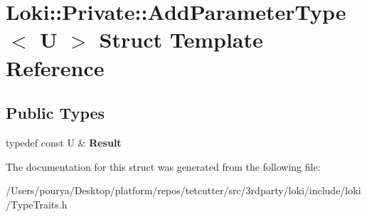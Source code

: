 \hypertarget{structLoki_1_1Private_1_1AddParameterType}{}\section{Loki\+:\+:Private\+:\+:Add\+Parameter\+Type$<$ U $>$ Struct Template Reference}
\label{structLoki_1_1Private_1_1AddParameterType}
\subsection*{Public Types}
\begin{DoxyCompactItemize}
\item 
\hypertarget{structLoki_1_1Private_1_1AddParameterType_a285374e6319a057f9286b92680266062}{}typedef const U \& {\bfseries Result}\label{structLoki_1_1Private_1_1AddParameterType_a285374e6319a057f9286b92680266062}

\end{DoxyCompactItemize}


The documentation for this struct was generated from the following file\+:\begin{DoxyCompactItemize}
\item 
/\+Users/pourya/\+Desktop/platform/repos/tetcutter/src/3rdparty/loki/include/loki/Type\+Traits.\+h\end{DoxyCompactItemize}
